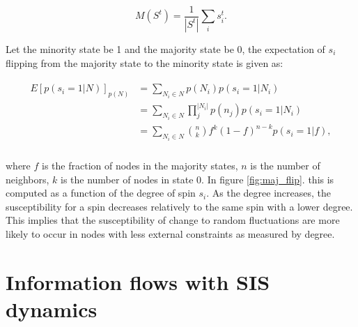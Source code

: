\documentclass[a4paper, 11pt, twocolumn]{article}
\begin{document}
\begin{equation}
M(S^t) = \frac{1}{|S^t|} \sum_i s_i^t.
\end{equation}

Let the minority  state be 1 and the majority  state be 0,
the expectation of $s_i$ flipping from the majority state to
the minority state is given as:

\begin{align}
\label{majority_flip}
    \begin{aligned}
        E[ p(s_i = 1 | N ) ]_{p(N)} &= \sum_{N_i \in N} p(N_i) p(s_i = 1 | N_i)\\
            &= \sum_{N_i \in  N} \prod_j^{|N_i|} p(n_j) p(s_i  = 1 |N_i)\\
            &=  \sum_{N_i \in N}  {n\choose k} f^k  (1  -
            f)^{n-k}  p(s_i  = 1 | f), \\
    \end{aligned}
\end{align}

where $f$ is  the fraction of nodes in  the majority states,
$n$ is the  number of neighbors, $k$ is the  number of nodes
in state 0. In figure \cref{fig:maj_flip}. this is computed
as a  function of the  degree of  spin $s_i$. As  the degree
increases,   the  susceptibility   for   a  spin   decreases
relatively  to  the same  spin  with  a lower  degree.  This
implies  that   the  susceptibility  of  change   to  random
fluctuations are  more likely  to occur  in nodes  with less
external constraints as measured by degree.

\section{Information flows with SIS  dynamics}
\end{document}

